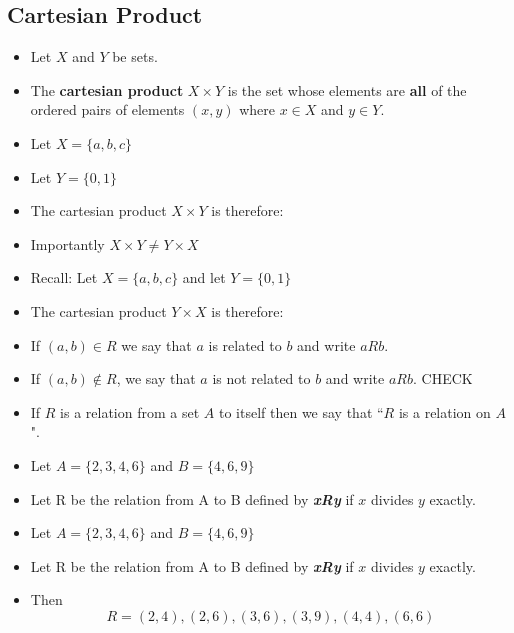 \documentclass[]{report}
\begin{document}
\subsection{Cartesian Product}
{
\begin{itemize}
\item Let $X$ and $Y$ be sets.
\item The \textbf{cartesian product} $X \times Y$ is the set whose elements are \textbf{all} of the ordered pairs of elements $(x,y)$ where $x \in X$ and $y \in Y$.
\end{itemize}


\begin{itemize}
\item Let $X = \{a,b,c\}$
\item Let $Y = \{0,1\}$ 
\item The cartesian product $X \times Y$ is therefore:
\end{itemize}

\begin{itemize}
\item Importantly $X \times Y \neq Y \times X$
\item Recall: Let $X = \{a,b,c\}$ and let $Y = \{0,1\}$ 
\item The cartesian product $Y \times X$ is therefore:
\end{itemize}
}


\newpage

\begin{itemize}

\item  If $(a, b) \in R$ we say that $a$ is related to $b$ and write $aRb$.
\item If $(a, b) \notin R$, we say that $a$ is not related to $b$ and write $aRb$. CHECK
\item If
$R$ is a relation from a set $A$ to itself then we say that ``$R$ is a relation
on $A$".

\item Let $A = \{2, 3, 4, 6\}$ and $B = \{4, 6, 9\}$
\item Let R be the relation from A to B defined by \textit{\textbf{xRy}} if $x$
divides $y$ exactly.


\item Let $A = \{2, 3, 4, 6\}$ and $B = \{4, 6, 9\}$
\item Let R be the relation from A to B defined by \textit{\textbf{xRy}} if $x$
divides $y$ exactly.
\item  Then
\[R = {(2, 4), (2, 6), (3, 6), (3, 9), (4, 4), (6, 6)}\]
\end{itemize}
\end{document}
